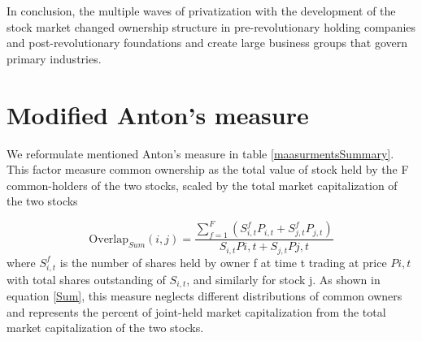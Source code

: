 \begin{appendices}
	In conclusion, the multiple waves of privatization with the development of the stock market changed ownership structure in pre-revolutionary holding companies and post-revolutionary foundations and create large business groups that govern primary  industries.
	
	

%		
%	
	
	
	\FloatBarrier


	\section{{Modified Anton's measure}}
	\label{ModifiedMeasure}
We reformulate mentioned Anton's measure in table \ref{maasurmentsSummary}. This factor measure common ownership as the total value of
stock held by the F common-holders of the two stocks, scaled by the total market capitalization of the two stocks

		\begin{equation}
			\text{Overlap}_{Sum}(i, j) = \frac{\sum_{f = 1}^{F} (S^f_{i,t}P_{i,t}+S^f_{j,t}P_{j,t})}{S_{i,t}P{i,t} + S_{j,t}P{j,t}}
			\label{Sum}
		\end{equation}
where $ S^f_{i,t}$ is the number of shares held by owner f
at time t trading at price $ P{i,t} $ with total shares outstanding of $ S_{i,t} $, and similarly for stock j. 
As shown in equation \ref{Sum}, this measure neglects different distributions of common owners and represents the percent of joint-held market capitalization from the total market capitalization of the two stocks.


\end{appendices}
